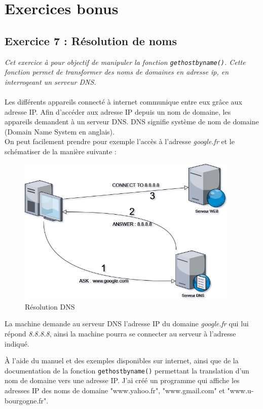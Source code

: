 \section{Exercices bonus}
\subsection{Exercice 7 : Résolution de noms}
\textit{Cet exercice à pour objectif de manipuler la fonction \texttt{gethostbyname()}. Cette fonction permet de transformer des noms de domaines en adresse ip, en interrogeant un serveur DNS.}
\\\\
Les différents appareils connecté à internet communique entre eux grâce aux adresse IP. Afin d'accéder aux adresse IP depuis un nom de domaine, les appareils demandent à un serveur DNS. DNS signifie système de nom de domaine (Domain Name System en anglais).\\
On peut facilement prendre pour exemple l'accès à l'adresse \textit{google.fr} et le schématiser de la manière suivante :

\begin{figure}[H]
\centering
\includegraphics[width=300pt]{./cpp/Pictures/tp7+tp8-DNS}
\caption{Résolution DNS}
\label{Résolution DNS}
\end{figure}

La machine demande au serveur DNS l'adresse IP du domaine \textit{google.fr} qui lui répond \textit{8.8.8.8}, ainsi la machine pourra se connecter au serveur à l'adresse indiqué.

À l’aide du manuel et des exemples disponibles sur internet, ainsi que de la documentation de la fonction \texttt{gethostbyname()} permettant la translation d’un nom de domaine vers une adresse IP. J'ai créé un programme qui affiche les adresses IP des noms de domaine "www.yahoo.fr", "www.gmail.com" et "www.u-bourgogne.fr".

\inputminted[linenos,firstline=10,lastline=36]{cpp}{../sources/cpp/TP7-8/getHostByName.c}

